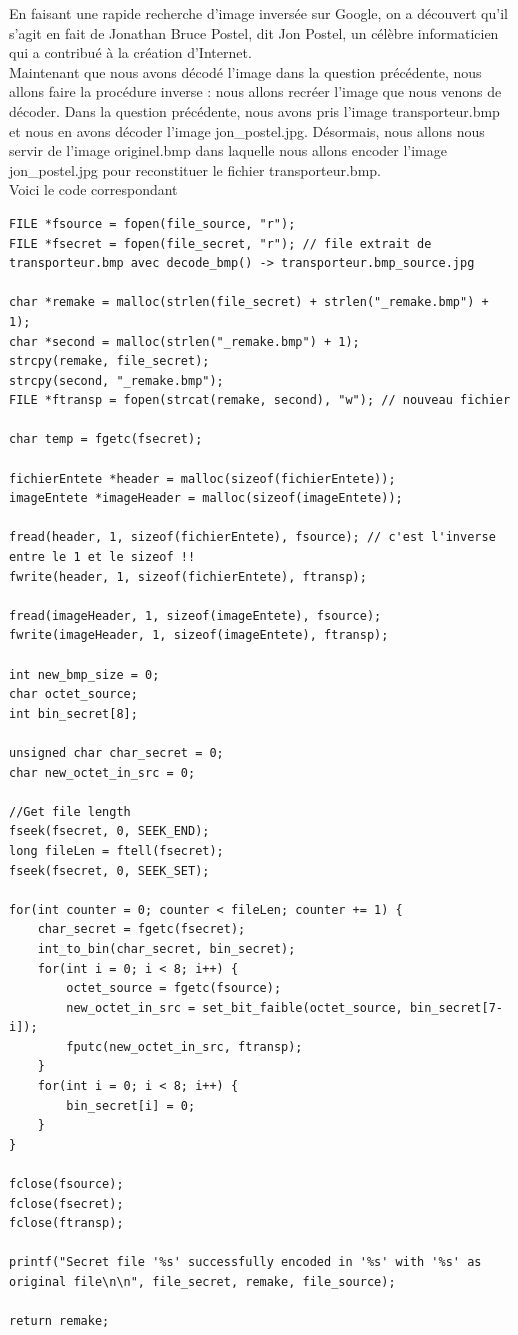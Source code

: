 \documentclass[12pt]{article}
\begin{document}
\newline
En faisant une rapide recherche d'image inversée sur Google, on a découvert qu'il s'agit en fait de Jonathan Bruce Postel, dit Jon Postel, un célèbre informaticien qui a contribué à la création d'Internet. \\
Maintenant que nous avons décodé l'image dans la question précédente, nous allons faire la procédure inverse : nous allons recréer l'image que nous venons de décoder. Dans la question précédente, nous avons pris l'image transporteur.bmp et nous en avons décoder l'image jon\_postel.jpg. Désormais, nous allons nous servir de l'image originel.bmp dans laquelle nous allons encoder l'image jon\_postel.jpg pour reconstituer le fichier transporteur.bmp. \\
Voici le code correspondant
\begin{lstlisting}[style=languageClarge, caption=Encodage d'un jpg secret dans une image bmp]
FILE *fsource = fopen(file_source, "r");
FILE *fsecret = fopen(file_secret, "r"); // file extrait de transporteur.bmp avec decode_bmp() -> transporteur.bmp_source.jpg

char *remake = malloc(strlen(file_secret) + strlen("_remake.bmp") + 1);
char *second = malloc(strlen("_remake.bmp") + 1);
strcpy(remake, file_secret);
strcpy(second, "_remake.bmp");
FILE *ftransp = fopen(strcat(remake, second), "w"); // nouveau fichier

char temp = fgetc(fsecret);

fichierEntete *header = malloc(sizeof(fichierEntete));
imageEntete *imageHeader = malloc(sizeof(imageEntete));

fread(header, 1, sizeof(fichierEntete), fsource); // c'est l'inverse entre le 1 et le sizeof !!
fwrite(header, 1, sizeof(fichierEntete), ftransp);

fread(imageHeader, 1, sizeof(imageEntete), fsource);
fwrite(imageHeader, 1, sizeof(imageEntete), ftransp);

int new_bmp_size = 0;
char octet_source;
int bin_secret[8];

unsigned char char_secret = 0;
char new_octet_in_src = 0;

//Get file length
fseek(fsecret, 0, SEEK_END);
long fileLen = ftell(fsecret);
fseek(fsecret, 0, SEEK_SET);

for(int counter = 0; counter < fileLen; counter += 1) {
    char_secret = fgetc(fsecret);
    int_to_bin(char_secret, bin_secret);
    for(int i = 0; i < 8; i++) {
        octet_source = fgetc(fsource);
        new_octet_in_src = set_bit_faible(octet_source, bin_secret[7-i]);
        fputc(new_octet_in_src, ftransp);
    }
    for(int i = 0; i < 8; i++) {
        bin_secret[i] = 0;
    }
}

fclose(fsource);
fclose(fsecret);
fclose(ftransp);

printf("Secret file '%s' successfully encoded in '%s' with '%s' as original file\n\n", file_secret, remake, file_source);

return remake;
\end{lstlisting}
\end{document}
